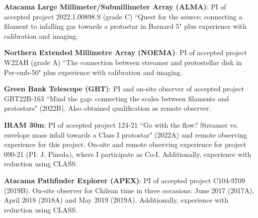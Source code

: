 \vspace{8pt}

\begin{cvitems} %
 \item {\textbf{Atacama Large Millimeter/Submillimeter Array (ALMA)}: PI of accepted project 2022.1.00898.S (grade C) ``Quest for the source: connecting a filament to infalling gas towards a protostar in Barnard 5" plus experience with calibration and imaging.}
\item {\textbf{Northern Extended Millimetre Array (NOEMA)}: PI of accepted project W22AH (grade A) ``The connection between streamer and protostellar disk in Per-emb-50" plus experience with calibration and imaging.}
\item {\textbf{Green Bank Telescope (GBT)}: PI and on-site observer of accepted project GBT22B-163 ``Mind the gap: connecting the scales between filaments and protostars" (2022B). Also obtained qualification as remote observer.}
\item {\textbf{IRAM 30m}: PI of accepted project 124-21 ``Go with the flow? Streamer vs. envelope mass infall towards a Class I protostar" (2022A) and remote observing experience for this project. On-site and remote observing experience for project 090-21 (PI: J. Pineda), where I participate as Co-I. Additionally, experience with reduction using CLASS.}
\item {\textbf{Atacama Pathfinder Explorer (APEX)}: PI of accepted project C104-9709 (2019B). On-site observer for Chilean time in three occasions: June 2017 (2017A), April 2018 (2018A) and May 2019 (2019A). Additionally, experience with reduction using CLASS.}
\end{cvitems}